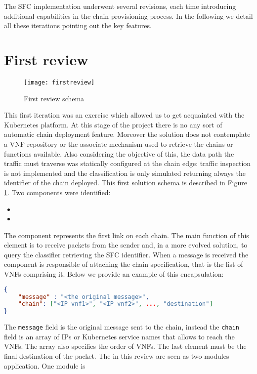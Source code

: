 The SFC implementation underwent several revisions, each time introducing
additional capabilities in the chain provisioning process. In the following we
detail all these iterations pointing out the key features.

\section{First review}
\begin{figure}
  \centering
  \texttt{[image: firstreview]}
  \caption{First review schema}
  \label{chap:impl:img:firstreview}
\end{figure}
This first iteration was an exercise which allowed us to get acquainted with the
Kubernetes platform. At this stage of the project there is no any sort of
automatic chain deployment feature. Moreover
the solution does not contemplate a VNF repository or the associate mechanism
used to retrieve the chains or functions available. Also considering the
objective of this, the data
path the traffic must traverse was statically configured at the chain edge:
traffic inspection is not implemented and the classification is only simulated
returning always the identifier of the chain deployed. This first solution
schema is described in Figure~ \ref{chap:impl:img:firstreview}. Two components
were identified: 
\begin{itemize} 
  \item \enchainer
  \item \vnfs
\end{itemize}
The \enchainer{} component represents the first link on each chain. The
main function of this element is to receive packets from the sender and, in a
more evolved
solution,
to query the classifier retrieving the SFC identifier. 
When a message is received the component is responsible of attaching the chain
specification, that is the list of VNFs comprising it. Below we provide an
example of this encapsulation:
\begin{lstlisting}[language=json]
{
    "message" : "<the original message>",
    "chain": ["<IP vnf1>", "<IP vnf2>", ..., "destination"]
}
\end{lstlisting}
The \texttt{message} field is the original message sent to the chain,
instead the \texttt{chain} field is an array of IPs or Kubernetes service names
that allows to reach the VNFs. The array also specifies the order of VNFs. The
last element
must be the final destination of the packet. 
The \vnf{} in this review are seen as two modules application. One module is
